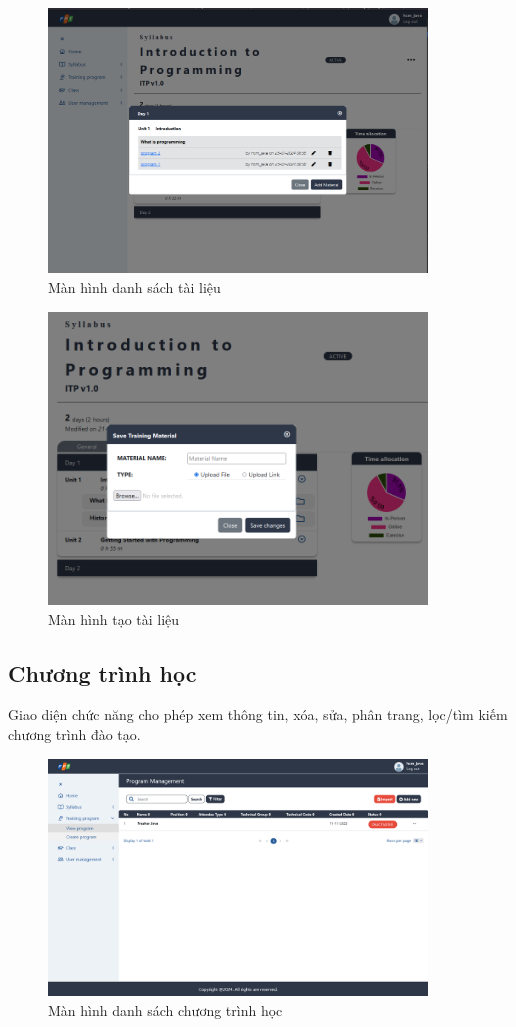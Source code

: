 \documentclass[report.tex]{subfiles}
\begin{document}
\begin{figure}[!htb]
{\centering
\includegraphics[width=380px]{../meta/ui.material-list.png}
\caption{Màn hình danh sách tài liệu}
\par
}
\end{figure}
\FloatBarrier

\begin{figure}[!htb]
{\centering
\includegraphics[width=380px]{../meta/ui.material-create1.png}
\caption{Màn hình tạo tài liệu}
\par
}
\end{figure}
\FloatBarrier

\subsection{Chương trình học}

Giao diện chức năng cho phép xem thông tin, xóa, sửa, phân trang, lọc/tìm kiếm chương trình đào tạo.

\begin{figure}[!htb]
{\centering
\includegraphics[width=380px]{../meta/ui.program-list.png}
\caption{Màn hình danh sách chương trình học}
\par
}
\end{figure}
\FloatBarrier
\end{document}
